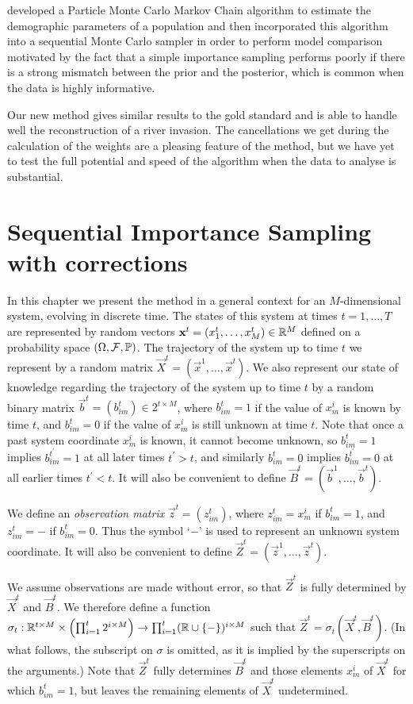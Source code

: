\cite{Finke} developed a Particle Monte Carlo Markov Chain algorithm to estimate the demographic parameters of a population and then incorporated this algorithm into a sequential Monte Carlo sampler in order to perform model comparison motivated by the fact that a simple importance sampling performs poorly if there is a strong mismatch between the prior and the posterior, which is common when the data is highly informative.

Our new method gives similar results to the gold standard and is able to handle well the reconstruction of a river invasion. The cancellations we get during the calculation of the weights are a pleasing feature of the method, but we have yet to test the full potential and speed of the algorithm when the data to analyse is substantial.

\section{Sequential Importance Sampling with corrections}
\label{sec:2}

In this chapter we present the method in a general context for an $M$-dimensional system, evolving in discrete time. The states of this system at times $t = 1, \dots, T$ are represented by random vectors $\mathbf{x}^t = (x^t_1, \dots, x^t_M) \in \mathbb R^M$ defined on a probability space $(\Omega, \mathcal{F}, \mathbb{P})$. The trajectory of the system up to time $t$ we represent by a random matrix $\vec{X}^t = (\vec{x}^1, \ldots, \vec{x}^t)$. We also represent our state of knowledge regarding the trajectory of the system up to time $t$ by a random binary matrix $\vec{b}^t = (b^t_{im}) \in 2^{t \times M}$, where $b^t_{im} = 1$ if the value of $x^i_m$ is known by time $t$, and $b^t_{im} = 0$ if the value of $x^i_m$ is still unknown at time $t$. Note that once a past system coordinate $x^i_m$ is known, it cannot become unknown, so $b^t_{im} = 1$ implies $b^{t^\prime}_{im} = 1$ at all later times $t^{\prime} > t$, and similarly $b^t_{im} = 0$ implies $b^{t^{\prime}}_{im} = 0$ at all earlier times $t^{\prime} < t$. It will also be convenient to define $\vec{B}^t = (\vec{b}^1,\ldots,\vec{b}^t)$.

We define an {\em observation matrix} $\vec{z}^t = (z^t_{im})$, where $z^t_{im} = x^i_m$ if $b^t_{im} = 1$, and $z^t_{im} = -$ if $b^t_{im} = 0$. Thus the symbol `$-$' is used to represent an unknown system coordinate. It will also be convenient to define $\vec{Z}^t = (\vec{z}^1,\ldots,\vec{z}^t)$. 

We assume observations are made without error, so that $\vec{Z}^t$ is fully determined by $\vec{X}^t$ and $\vec{B}^t$. We therefore define a function $\sigma_t: \mathbb R^{t \times M} \times \left( \prod_{i=1}^t 2^{i \times M} \right) \rightarrow \prod_{i=1}^t (\mathbb R \cup \{ - \})^{i \times M}$ such that $\vec{Z}^t = \sigma_t(\vec{X}^t, \vec{B}^t)$. (In what follows, the subscript on $\sigma$ is omitted, as it is implied by the superscripts on the arguments.) Note that $\vec{Z}^t$ fully determines $\vec{B}^t$ and those elements $x_m^i$ of $\vec{X}^t$ for which $b_{im}^t = 1$, but leaves the remaining elements of $\vec{X}^t$ undetermined.

